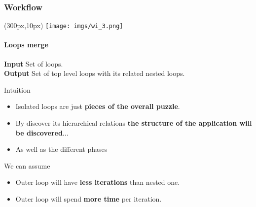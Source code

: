 \documentclass{beamer}
\begin{document}
\begin{frame}
\frametitle{Workflow}
\begin{textblock*}{5cm}(300px,10px) %
	\texttt{[image: imgs/wi\_3.png]}
\end{textblock*}
\framesubtitle{Loops merge}
\begin{mdframed}[backgroundcolor=black!10,roundcorner=5pt,linewidth=0pt]
\textbf{Input} Set of loops.\\
\textbf{Output} Set of top level loops with its related nested loops.
\end{mdframed}
\vspace{10px}
\pause
\vfill
Intuition
\begin{itemize}
	\item Isolated loops are just \textbf{pieces of the overall puzzle}.
	\item By discover its hierarchical relations \textbf{the structure of the application will be discovered}...
	\item As well as the different phases
\end{itemize}
\pause
We can assume
\begin{itemize}
	\item Outer loop will have \textbf{less iterations} than nested one.
	\item Outer loop will spend \textbf{more time} per iteration.
\end{itemize}
\end{frame}
\end{document}
